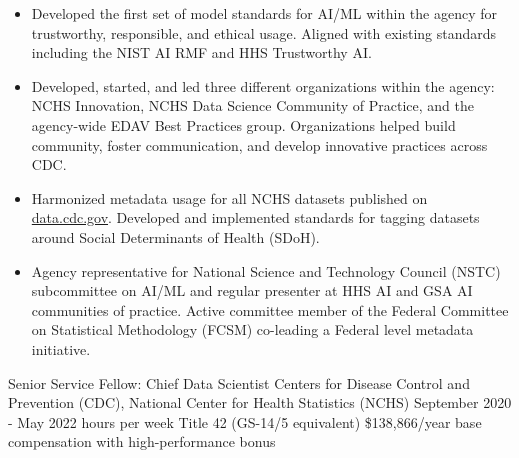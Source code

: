 \documentclass[]{scrartcl}
\begin{document}
\begin{cleanCV}
{\begin{itemize}
  \item Developed the first set of model standards for AI/ML within the agency for trustworthy, responsible, and ethical usage. Aligned with existing standards including the NIST AI RMF and HHS Trustworthy AI.
    
  \item Developed, started, and led three different organizations within the agency: NCHS Innovation, NCHS Data Science Community of Practice, and the agency-wide EDAV Best Practices group. Organizations helped build community, foster communication, and develop innovative practices across CDC.

  \item Harmonized metadata usage for all NCHS datasets published on \href{https://data.cdc.gov/browse?category=NCHS}{data.cdc.gov}. Developed and implemented standards for tagging datasets around Social Determinants of Health (SDoH).
    
      \item Agency representative for National Science and Technology Council (NSTC) subcommittee on AI/ML and regular presenter at HHS AI and GSA AI communities of practice. Active committee member of the Federal Committee on Statistical Methodology (FCSM) co-leading a Federal level metadata initiative.

  \end{itemize}
}

\vspace{1em}

    
  \WorkExperience
{}
{Senior Service Fellow: Chief Data Scientist}
{
  \newline Centers for Disease Control and Prevention (CDC), National Center for
Health Statistics (NCHS)
  \newline September 2020 - May 2022
   hours per week
  \newline Title 42 (GS-14/5 equivalent) \$138,866/year base compensation with high-performance bonus 
}
{
  \vspace{-0.25em}
  \begin{itemize}


\end{itemize}}
\end{cleanCV}
\end{document}
